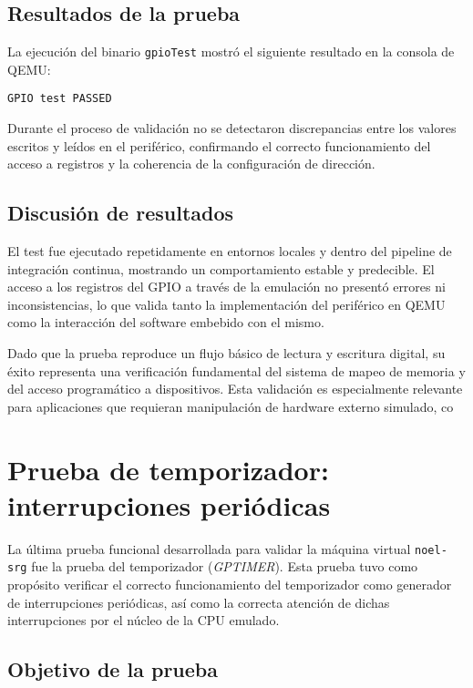 \subsection*{Resultados de la prueba}

La ejecución del binario \texttt{gpioTest} mostró el siguiente resultado en la consola de QEMU:

\begin{verbatim}
GPIO test PASSED
\end{verbatim}

Durante el proceso de validación no se detectaron discrepancias entre los valores escritos y leídos en el periférico, confirmando el correcto funcionamiento del acceso a registros y la coherencia de la configuración de dirección.

\subsection*{Discusión de resultados}

El test fue ejecutado repetidamente en entornos locales y dentro del pipeline de integración continua, mostrando un comportamiento estable y predecible. El acceso a los registros del GPIO a través de la emulación no presentó errores ni inconsistencias, lo que valida tanto la implementación del periférico en QEMU como la interacción del software embebido con el mismo.

Dado que la prueba reproduce un flujo básico de lectura y escritura digital, su éxito representa una verificación fundamental del sistema de mapeo de memoria y del acceso programático a dispositivos. Esta validación es especialmente relevante para aplicaciones que requieran manipulación de hardware externo simulado, co

\section{Prueba de temporizador: interrupciones periódicas}
\label{subsec:timer-test}

La última prueba funcional desarrollada para validar la máquina virtual \texttt{noel-srg} fue la prueba del temporizador (\emph{GPTIMER}). Esta prueba tuvo como propósito verificar el correcto funcionamiento del temporizador como generador de interrupciones periódicas, así como la correcta atención de dichas interrupciones por el núcleo de la CPU emulado.

\subsection*{Objetivo de la prueba}


